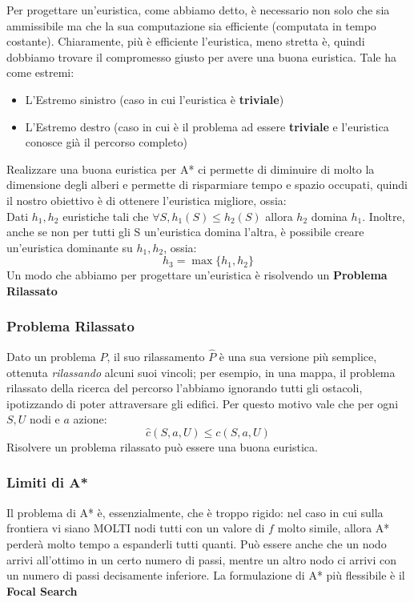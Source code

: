 Per progettare un'euristica, come abbiamo detto, è necessario non solo che sia ammissibile ma che la sua computazione sia efficiente (computata in tempo costante).
Chiaramente, più è efficiente l'euristica, meno stretta è, quindi dobbiamo trovare il compromesso giusto per avere una buona euristica.
Tale ha come estremi:
\begin{itemize}
    \item L'Estremo sinistro (caso in cui l'euristica è \textbf{triviale})
    \item L'Estremo destro (caso in cui è il problema ad essere \textbf{triviale} e l'euristica conosce già il percorso completo)
\end{itemize}
Realizzare una buona euristica per A* ci permette di diminuire di molto la dimensione degli alberi e permette di risparmiare tempo e spazio occupati, quindi il nostro obiettivo è di ottenere 
l'euristica migliore, ossia:\\
Dati $h_1, h_2 $ euristiche tali che $\forall S, h_1(S) \leq h_2(S)$ allora $h_2$ domina $h_1$. Inoltre, anche se non per tutti gli S un'euristica domina l'altra,
è possibile creare un'euristica dominante su $h_1, h_2$, ossia:
\begin{equation*}
    h_3 = \max\{h_1, h_2\}
\end{equation*}
Un modo che abbiamo per progettare un'euristica è risolvendo un \textbf{Problema Rilassato}

\subsubsection{Problema Rilassato}
Dato un problema $P$, il suo rilassamento $\hat{P}$ è una sua versione più semplice, ottenuta \textit{rilassando} alcuni suoi vincoli;
per esempio, in una mappa, il problema rilassato della ricerca del percorso l'abbiamo ignorando tutti gli ostacoli, ipotizzando di poter attraversare gli edifici.
Per questo motivo vale che per ogni $S,U$ nodi e $a$ azione:
\begin{equation*}
    \hat{c}(S,a,U) \leq c(S,a,U)
\end{equation*}
Risolvere un problema rilassato può essere una buona euristica.

\subsubsection{Limiti di A*}
Il problema di A* è, essenzialmente, che è troppo rigido: nel caso in cui sulla frontiera vi siano MOLTI nodi tutti con un valore di $f$
molto simile, allora A* perderà molto tempo a espanderli tutti quanti. Può essere anche che un nodo arrivi all'ottimo in un certo numero di passi,
mentre un altro nodo ci arrivi con un numero di passi decisamente inferiore. La formulazione di A* più flessibile è il \textbf{Focal Search}


